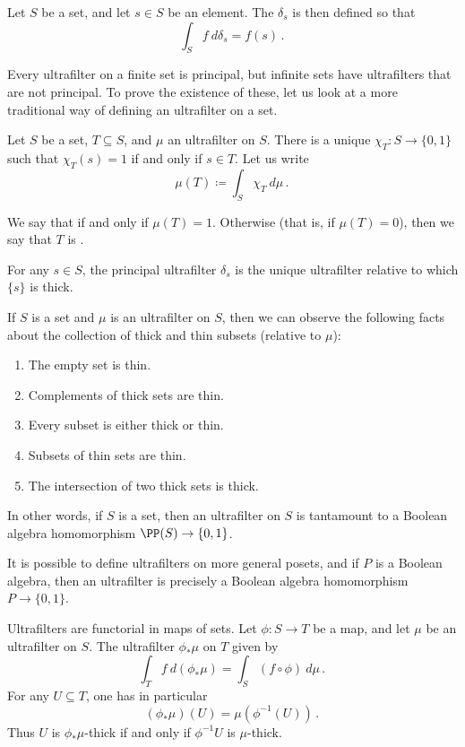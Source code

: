 \begin{eg}
	Let $ S $ be a set, and let $ s \in S $ be an element.
	The  $ \delta_s $ is then defined so that
	\[
		\int_S f \ d \delta_s = f(s) \period
	\]
\end{eg}

Every ultrafilter on a finite set is principal,
but infinite sets have ultrafilters that are not principal.
To prove the existence of these, let us look at a more traditional way of defining an ultrafilter on a set.

\begin{definition}
	Let $ S $ be a set, $ T \subseteq S$, and $ \mu $ an ultrafilter on $ S $.
	There is a unique  $ \chi_T \colon S \to \{ 0,1 \}$ such that $ \chi_T(s) = 1 $ if and only if $ s \in T $.
	Let us write
	\[
		\mu(T) \coloneq \int_S \chi_T \ d \mu \period
	\]
	
	We say that  if and only if $\mu(T) = 1$.
	Otherwise (that is, if $ \mu(T) = 0 $), then we say that $ T $ is .

	For any $ s \in S$, the principal ultrafilter $ \delta_s $ is the unique ultrafilter relative to which $ \{ s \} $ is thick.
\end{definition}

\begin{scholium}
	If $ S $ is a set and $ \mu $ is an ultrafilter on $ S $, then we can observe the following facts about the collection of thick and thin subsets (relative to $ \mu $):
	\begin{enumerate}
		\item The empty set is thin.
		\item Complements of thick sets are thin.
		\item Every subset is either thick or thin.
		\item Subsets of thin sets are thin.
		\item The intersection of two thick sets is thick.
	\end{enumerate}
	In other words, if $ S $ is a set, then an ultrafilter on $ S $ is tantamount to a Boolean algebra homomorphism $ \PP(S) \to \{0,1\} $.

	It is possible to define ultrafilters on more general posets, and if $ P $ is a Boolean algebra, then an ultrafilter is precisely a Boolean algebra homomorphism $ P \to \{0, 1\} $.
\end{scholium}

\begin{scholium}
	Ultrafilters are functorial in maps of sets.
	Let $ \phi \colon S \to T $ be a map, and let $ \mu $ be an ultrafilter on $ S $.
	The ultrafilter $ \phi_{\ast}\mu $ on $ T $ given by
	\[
		\int_T f \ d (\phi_{\ast}\mu) = \int_S (f \circ \phi) \ d \mu \period
	\]
	For any $ U \subseteq T$, one has in particular
	\[
		(\phi_{\ast} \mu)(U) = \mu (\phi^{-1}(U)) \period
	\]
	Thus $ U $ is $ \phi_{\ast} \mu $-thick if and only if $ \phi^{-1} U $ is $ \mu $-thick.
\end{scholium}


